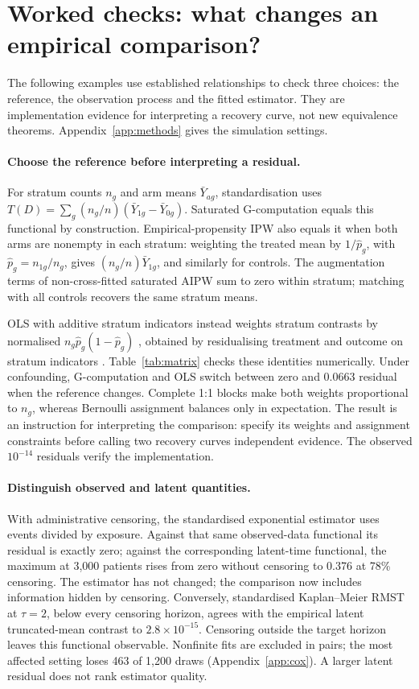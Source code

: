 \section{Worked checks: what changes an empirical comparison?}
\label{sec:matrix}

The following examples use established relationships to check three choices:
the reference, the observation process and the fitted estimator. They are
implementation evidence for interpreting a recovery curve, not new equivalence
theorems. Appendix~\ref{app:methods} gives the simulation settings.

\paragraph{Choose the reference before interpreting a residual.}
For stratum counts $n_g$ and arm means $\bar Y_{ag}$, standardisation uses
$T(D)=\sum_g(n_g/n)(\bar Y_{1g}-\bar Y_{0g})$.
Saturated G-computation \citep{robins1986} equals this functional by construction.
Empirical-propensity IPW also equals it when both arms are nonempty in each
stratum: weighting the treated mean by $1/\hat p_g$, with
$\hat p_g=n_{1g}/n_g$, gives $(n_g/n)\bar Y_{1g}$, and similarly for controls.
The augmentation terms of non-cross-fitted saturated AIPW sum to zero within
stratum; matching with all controls recovers the same stratum means.

OLS with additive stratum indicators instead weights stratum contrasts by
normalised $n_g\hat p_g(1-\hat p_g)$ \citep{angrist1998}, obtained by
residualising treatment and outcome on stratum indicators
\citep{frisch1933}. Table~\ref{tab:matrix} checks these identities numerically.
Under confounding, G-computation and OLS switch between zero and 0.0663
residual when the reference changes. Complete 1:1 blocks make both weights
proportional to $n_g$, whereas Bernoulli assignment balances only in expectation.
The result is an instruction for interpreting the comparison: specify its
weights and assignment constraints before calling two recovery curves independent
evidence. The observed $10^{-14}$ residuals verify the implementation.



\paragraph{Distinguish observed and latent quantities.}
With administrative censoring, the standardised exponential estimator uses
events divided by exposure. Against that same observed-data functional its
residual is exactly zero; against the corresponding latent-time functional,
the maximum at 3{,}000 patients rises from zero without censoring to 0.376 at
78\% censoring. The estimator has not changed; the comparison now includes
information hidden by censoring. Conversely, standardised Kaplan--Meier RMST
at $\tau=2$, below every censoring horizon, agrees with the empirical latent
truncated-mean contrast to $2.8\times10^{-15}$. Censoring outside the target
horizon leaves this functional observable. Nonfinite fits are excluded in
pairs; the most affected setting loses 463 of 1{,}200 draws
(Appendix~\ref{app:cox}). A larger latent residual does not rank estimator quality.

